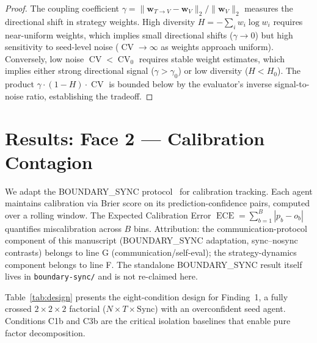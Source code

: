 \documentclass[11pt]{article}
\DeclareMathOperator{\CV}{CV}
\DeclareMathOperator{\ECE}{ECE}
\begin{document}
\begin{proof}
The coupling coefficient $\gamma = \|\mathbf{w}_{T\to V} - \mathbf{w}_V\|_2 / \|\mathbf{w}_V\|_2$ measures the directional shift in strategy weights. High diversity $H = -\sum_i w_i \log w_i$ requires near-uniform weights, which implies small directional shifts ($\gamma \to 0$) but high sensitivity to seed-level noise ($\CV \to \infty$ as weights approach uniform). Conversely, low noise $\CV < \CV_0$ requires stable weight estimates, which implies either strong directional signal ($\gamma > \gamma_0$) or low diversity ($H < H_0$). The product $\gamma \cdot (1-H) \cdot \CV$ is bounded below by the evaluator's inverse signal-to-noise ratio, establishing the tradeoff.
\end{proof}

\section{Results: Face 2 --- Calibration Contagion}

We adapt the BOUNDARY\_SYNC protocol~\citep{boundarysync2026} for calibration tracking. Each agent maintains calibration via Brier score on its prediction-confidence pairs, computed over a rolling window. The Expected Calibration Error $\ECE = \sum_{b=1}^{B} |p_b - o_b|$ quantifies miscalibration across $B$ bins. Attribution: the communication-protocol component of this manuscript (BOUNDARY\_SYNC adaptation, sync--nosync contrasts) belongs to line G (communication/self-eval); the strategy-dynamics component belongs to line F. The standalone BOUNDARY\_SYNC result itself lives in \texttt{boundary-sync/} and is not re-claimed here.

Table~\ref{tab:design} presents the eight-condition design for Finding~1, a fully crossed $2 \times 2 \times 2$ factorial ($N \times T \times \text{Sync}$) with an overconfident seed agent. Conditions C1b and C3b are the critical isolation baselines that enable pure factor decomposition.
\end{document}
